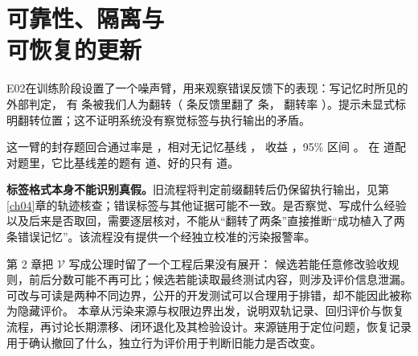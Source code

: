 \chapter[可靠性、隔离与可恢复的更新]{可靠性、隔离与\\可恢复的更新}
\label{ch14}


\begin{failurebox}
E02在训练阶段设置了一个噪声臂，用来观察错误反馈下的表现：写记忆时所见的外部判定，
有  条被我们人为翻转（ 条反馈里翻了  条，
翻转率 ）。提示未显式标明翻转位置；这不证明系统没有察觉标签与执行输出的矛盾。

这一臂的封存题回合通过率是 ，相对无记忆基线 ，
收益 ，95\% 区间 \measured{$[-0.3125, +0.0125]$}。
在  道配对题里，它比基线差的题有  道、好的只有  道。

\textbf{标签格式本身不能识别真假。}旧流程将判定前缀翻转后仍保留执行输出，见第\ref{ch04}章的轨迹核查；错误标签与其他证据可能不一致。是否察觉、写成什么经验以及后来是否取回，需要逐层核对，不能从“翻转了两条”直接推断“成功植入了两条错误记忆”。该流程没有提供一个经独立校准的污染报警率。
\end{failurebox}


第 2 章把 $\mathcal V$ 写成公理时留了一个工程后果没有展开：
候选若能任意修改验收规则，前后分数可能不再可比；候选若能读取最终测试内容，则涉及评价信息泄漏。可改与可读是两种不同边界，公开的开发测试可以合理用于排错，却不能因此被称为隐藏评价。
本章从污染来源与权限边界出发，说明双轨记录、回归评价与恢复流程，再讨论长期漂移、闭环退化及其检验设计。来源链用于定位问题，恢复记录用于确认撤回了什么，独立行为评价用于判断旧能力是否改变。

